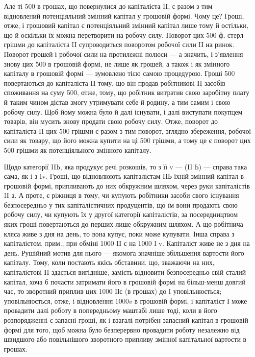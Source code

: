 
Але ті 500 в грошах, що повернулися до капіталіста II, є разом з
тим відновлений потенціяльний змінний капітал у грошовій формі. Чому
це? Гроші, отже, і грошовий капітал є потенціяльний змінний капітал
лише тому й остільки, що й оскільки їх можна перетворити на робочу
силу. Поворот цих 500 ф. стерл грішми до капіталіста II супроводиться
поворотом робочої сили II на ринок. Поворот грошей і робочої сили на
протилежні полюси — а значить, і з’явлення знову цих 500 в грошовій
формі, не лише як грошей, а також і як змінного капіталу в грошовій
формі — зумовлено тією самою процедурою. Гроші \deq{} 500 повертаються до
капіталіста II тому, що він продав робітникові II засобів споживання на
суму 500, отже, тому, що робітник витратив свою заробітну плату й таким
чином дістав змогу утримувати себе й родину, а тим самим і свою
робочу силу. Щоб йому можна було й далі існувати, і далі виступати
покупцем товарів, він мусить знову продати свою робочу силу. Отже,
поворот до капіталіста II цих 500 грішми є разом з тим поворот, зглядно
збереження, робочої сили як товару, що його можна купити на ці 500
грішми, а тому це є поворот цих 500 грішми як потенціяльного змінного
капіталу.

Щодо категорії IIЬ, яка продукує речі розкошів, то з її v —
(II Ь) — справа така сама, як і з Iv. Гроші, що відновлюють капіталістам
IIЬ їхній змінний капітал в грошовій формі, припливають до них
обкружним шляхом, через руки капіталістів II а. А проте, є ріжниця в
тому, чи купують робітники засоби свого існування безпосередньо у тих
капіталістичних продуцентів, що їм вони продають свою робочу силу, чи
купують їх у другої категорії капіталістів, за посередництвом яких гроші
повертаються до перших лише обкружним шляхом. А що робітнича кляса
живе з дня на день, то вона купує, поки може купувати. Інша справа
з капіталістом, прим., при обміні 1000 II с на 1000 І v. Капіталіст живе
не з дня на день. Рушійний мотив для нього — якомога значніше збільшення
вартости його капіталу. Тому, коли постають якісь обставини, що,
зважаючи на них, капіталістові II здається вигідніше, замість відновити
безпосередньо свій сталий капітал, хоча б почасти затримати його в
грошовій формі на більш-менш довгий час, то зворотний приплив цих
1000 ІІс (в грошах) до І уповільнюється; уповільнюється, отже, і відновлення
$1000 v$ в грошовій формі, і капіталіст І може провадити далі
роботу в попередньому маштабі лише тоді, коли в його розпорядженні
є запасні гроші, як і взагалі потрібен запасний капітал в грошовій формі
для того, щоб можна було безперервно провадити роботу незалежно від
швидшого або повільнішого зворотного припливу змінної капітальної вартости
в грошах.

